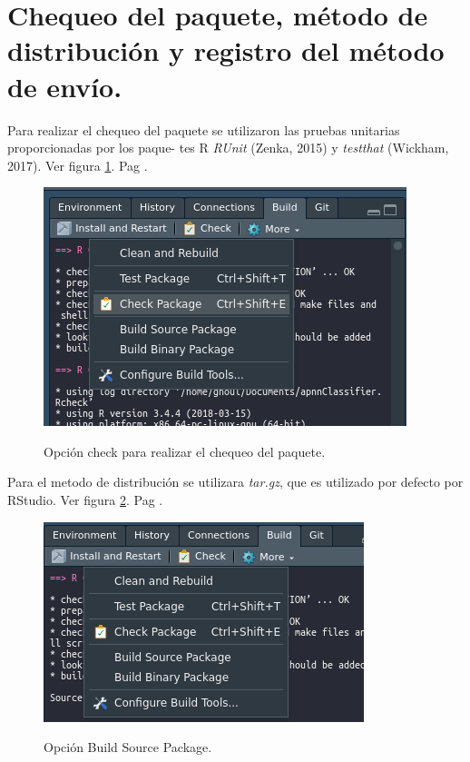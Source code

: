 \section{Chequeo del paquete, método de distribución y registro del método de envío.}

	Para realizar el chequeo del paquete se utilizaron las pruebas unitarias proporcionadas por los paque-
tes R \textit{RUnit} (Zenka, 2015) y \textit{testthat} (Wickham, 2017). Ver figura \ref{fig:check}. Pag \pageref{fig:check}.\\

\begin{figure}[h]
	\caption{Opción check para realizar el chequeo del paquete.}
	\centering
	\includegraphics[scale=0.5]{check.png}
	\label{fig:check}
\end{figure}

	Para el metodo de distribución se utilizara \textit{tar.gz}, que es utilizado por defecto por RStudio. Ver figura \ref{fig:build}. Pag \pageref{fig:build}.\\
	

\begin{figure}[h]
	\caption{Opción Build Source Package.}
	\centering
	\includegraphics[scale=0.5]{build.png}
	\label{fig:build}
\end{figure}
	
